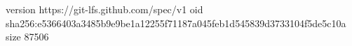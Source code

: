 version https://git-lfs.github.com/spec/v1
oid sha256:e5366403a3485b9e9be1a12255f71187a045feb1d545839d3733104f5de5c10a
size 87506
